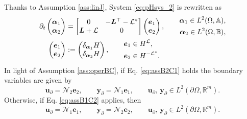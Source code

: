 Thanks to Assumption \ref{ass:linJ}, System \eqref{eq:pHsys_2} is rewritten as 
\begin{subequations}
	\label{eq:pHsys_ass} 
	\begin{align}
	\partial_t \begin{pmatrix}
	{\bm{\alpha}}_1 \\ {\bm{\alpha}}_2
	\end{pmatrix} &= \begin{bmatrix}
	0 & -\bm{L}^\top - \mathcal{L}^* \\
	\bm{L} + \mathcal{L} & 0 \\
	\end{bmatrix}\begin{pmatrix}
	\bm{e}_1 \\ \bm{e}_2
	\end{pmatrix} , \qquad \begin{aligned}
	\bm{\alpha}_1 \in L^2(\Omega, \mathbb{A}), 	\\
	\bm{\alpha}_2 \in L^2(\Omega, \mathbb{B}), 
	\end{aligned} \label{eq:pHsys_dyn_ass} \vspace{3pt}\\
	\begin{pmatrix}
	\bm{e}_1 \\ \bm{e}_2
	\end{pmatrix} &:= \begin{pmatrix}
	\delta_{\bm{\alpha}_1}H \\ \delta_{\bm{\alpha}_2}H
	\end{pmatrix} , \qquad \begin{aligned}
	\bm{e}_1 &\in H^\mathcal{L}, 	\\
	\bm{e}_2 &\in H^{-\mathcal{L}^*}.
	\end{aligned} \label{eq:pHsys_const_ass} 
	\end{align}
\end{subequations}
In light of Assumption \ref{ass:operBC}, if Eq. \eqref{eq:assB2C1} holds the boundary variables are given by 
\begin{equation}\label{eq:pHsys_assB2C1}
\bm{u}_\partial = \mathcal{N}_2 \displaystyle \bm{e}_2, \qquad  \bm{y}_\partial = \mathcal{N}_1 \displaystyle \bm{e}_1, \qquad  \bm{u}_\partial,\, \bm{y}_\partial \in L^2(\partial\Omega, \mathbb{R}^m).
\end{equation}
Otherwise, if Eq. \eqref{eq:assB1C2} applies, then
\begin{equation}\label{eq:pHsys_assB1C2}
\bm{u}_\partial = \mathcal{N}_1 \displaystyle \bm{e}_1, \qquad 
\bm{y}_\partial = \mathcal{N}_2 \displaystyle \bm{e}_2, \qquad  \bm{u}_\partial,\, \bm{y}_\partial \in L^2(\partial\Omega, \mathbb{R}^m). 
\end{equation}
